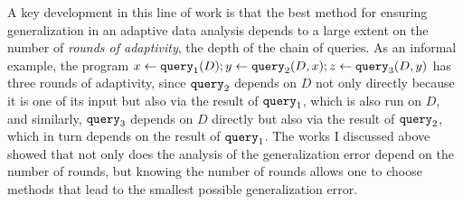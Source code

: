A key development in this line of work is that the best method for ensuring generalization in an adaptive data analysis depends to a large extent on the number of \emph{rounds of adaptivity}, the depth of the chain of queries. 
As an informal example, the program $x \leftarrow {\tt query}_1(D);y \leftarrow {\tt query}_2(D,x);z \leftarrow {\tt query}_3(D,y)$ has three rounds of adaptivity, since ${\tt query}_2$ depends on $D$ not only directly because it is one of its input but also via the result of ${\tt query}_1$, 
which is also run on $D$, and similarly, ${\tt query}_3$ depends on $D$ directly but also via the result of ${\tt query}_2$, which in turn depends on the result of ${\tt query}_1$. 
The works I discussed above showed that not only does the analysis of the generalization error depend on the number of rounds, 
but knowing the number of rounds allows one to choose methods that lead to the smallest possible generalization error. 

